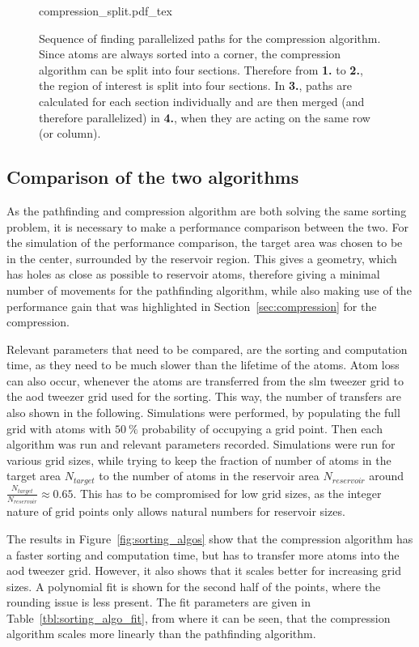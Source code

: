 \begin{figure}[tbp]%
\centering
{compression_split.pdf_tex}
\caption{Sequence of finding parallelized paths for the compression algorithm. Since atoms are always sorted into a corner, the compression algorithm can be split into four sections. Therefore from \textbf{1.} to \textbf{2.}, the region of interest is split into four sections. In \textbf{3.}, paths are calculated for each section individually and are then merged (and therefore parallelized) in \textbf{4.}, when they are acting on the same row (or column).}%
\label{fig:compression_split}
\end{figure}

\subsection{Comparison of the two algorithms}

As the pathfinding and compression algorithm are both solving the same sorting problem, it is necessary to make a performance comparison between the two. For the simulation of the performance comparison, the target area was chosen to be in the center, surrounded by the reservoir region. This gives a geometry, which has holes as close as possible to reservoir atoms, therefore giving a minimal number of movements for the pathfinding algorithm, while also making use of the performance gain that was highlighted in Section~\ref{sec:compression} for the compression.

Relevant parameters that need to be compared, are the sorting and computation time, as they need to be much slower than the lifetime of the atoms. Atom loss can also occur, whenever the atoms are transferred from the \ac{slm} tweezer grid to the \ac{aod} tweezer grid used for the sorting. This way, the number of transfers are also shown in the following.
Simulations were performed, by populating the full grid with atoms with $\SI{50}{\percent}$ probability of occupying a grid point. Then each algorithm was run and relevant parameters recorded. Simulations were run for various grid sizes, while trying to keep the fraction of number of atoms in the target area $N_{target}$ to the number of atoms in the reservoir area $N_{reservoir}$ around $\frac{N_{target}}{N_{reservoir}} \approx 0.65$. This has to be compromised for low grid sizes, as the integer nature of grid points only allows natural numbers for reservoir sizes.

The results in Figure~\ref{fig:sorting_algos} show that the compression algorithm has a faster sorting and computation time, but has to transfer more atoms into the \ac{aod} tweezer grid. However, it also shows that it scales better for increasing grid sizes. A polynomial fit is shown for the second half of the points, where the rounding issue is less present. The fit parameters are given in Table~\ref{tbl:sorting_algo_fit}, from where it can be seen, that the compression algorithm scales more linearly than the pathfinding algorithm.

